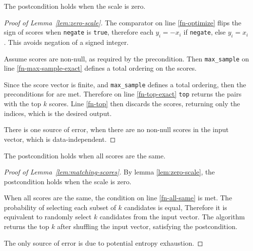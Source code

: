 \documentclass{article}
\begin{document}
\begin{lemma}
    \label{lem:zero-scale}
    The postcondition holds when the scale is zero.
\end{lemma}

\begin{proof}[Proof of Lemma~\ref{lem:zero-scale}]
    The comparator on line \ref{fn-optimize} flips the sign of scores when \texttt{negate} is \texttt{true},
    therefore each $y_i = -x_i$ if \texttt{negate}, else $y_i = x_i$.
    This avoids negation of a signed integer.

    Assume scores are non-null, as required by the precondition.
    Then \texttt{max\_sample} on line \ref{fn-max-sample-exact} defines a total ordering on the scores.

    Since the score vector is finite, and \texttt{max\_sample} defines a total ordering,
    then the preconditions for  are met.
    Therefore on line \ref{fn-top-exact} \texttt{top} returns the pairs with the top $k$ scores.
    Line \ref{fn-top} then discards the scores, returning only the indices,
    which is the desired output.

    There is one source of error,
    when there are no non-null scores in the input vector,
    which is data-independent.
\end{proof}

\begin{lemma}
    \label{lem:matching-scores}
    The postcondition holds when all scores are the same.
\end{lemma}

\begin{proof}[Proof of Lemma~\ref{lem:matching-scores}]
    By lemma \ref{lem:zero-scale}, the postcondition holds when the scale is zero.

    When all scores are the same, the condition on line \ref{fn-all-same} is met.
    The probability of selecting each subset of $k$ candidates is equal,
    Therefore it is equivalent to randomly select $k$ candidates from the input vector.
    The algorithm returns the top $k$ after shuffling the input vector,
    satisfying the postcondition.

    The only source of error is due to potential entropy exhaustion.
\end{proof}
\end{document}
